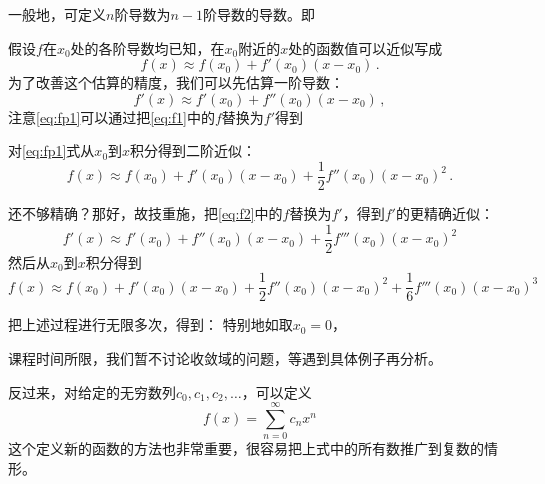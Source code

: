 \documentclass[CJK]{beamer}
\begin{document}
\begin{frame}
\bch
一般地，可定义$n$阶导数为$n-1$阶导数的导数。即


\ech
\end{frame}

\begin{frame}
\bch

假设$f$在$x_0$处的各阶导数均已知，在$x_0$附近的$x$处的函数值可以近似写成
\begin{equation}
  f(x) \approx f(x_0) + f'(x_0) (x-x_0)\, . \label{eq:f1}
\end{equation}
为了改善这个估算的精度，我们可以先估算一阶导数：
\begin{equation}
  f'(x) \approx f'(x_0) + f''(x_0)(x-x_0) \,, \label{eq:fp1}
\end{equation}
{\scriptsize 注意\eqref{eq:fp1}可以通过把\eqref{eq:f1}中的$f$替换为$f'$得到}

对\eqref{eq:fp1}式从$x_0$到$x$积分得到二阶近似：
\begin{equation}
  f(x) \approx f(x_0) + f'(x_0)(x-x_0) + \frac{1}{2}f''(x_0)(x-x_0)^2\,.\label{eq:f2}
\end{equation}
\ech
\end{frame}

\begin{frame}
\bch
还不够精确？那好，故技重施，把\eqref{eq:f2}中的$f$替换为$f'$，得到$f'$的更精确近似：
$$ f'(x) \approx f'(x_0) + f''(x_0)(x-x_0) + \frac{1}{2}f'''(x_0)(x-x_0)^2$$
然后从$x_0$到$x$积分得到
$$f(x) \approx f(x_0) + f'(x_0)(x-x_0) + \frac{1}{2}f''(x_0)(x-x_0)^2 + \frac{1}{6}f'''(x_0) (x-x_0)^3$$
\ech
\end{frame}


\begin{frame}
\bch
把上述过程进行无限多次，得到：
特别地如取$x_0=0$，

\skipline

课程时间所限，我们暂不讨论收敛域的问题，等遇到具体例子再分析。
\ech
\end{frame}


\begin{frame}
\bch
反过来，对给定的无穷数列$c_0, c_1, c_2, \ldots$，可以定义
$$ f(x) = \sum_{n=0}^\infty c_n x^n $$
这个定义新的函数的方法也非常重要，很容易把上式中的所有数推广到复数的情形。
\ech
\end{frame}
\end{document}
